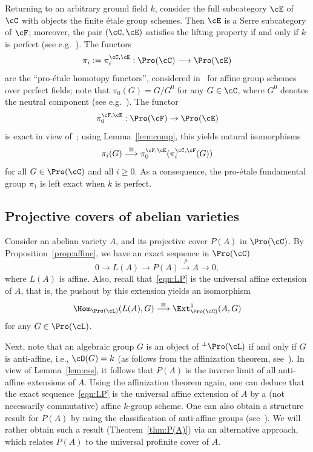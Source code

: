 \begin{rema}\label{rem:profinite}
Returning to an arbitrary ground field $k$, consider the full subcategory $\cE$ of $\cC$ with objects the finite \'etale group schemes. Then $\cE$ is a Serre subcategory of $\cF$; moreover, the pair $(\cC,\cE)$ satisfies the lifting property if and only if $k$ is perfect (see e.g.~\cite[Thm.~1.1, Rem.~3.3]{Br15}). The functors
\[
\pi_i := \pi_i^{\cC,\cE} :
\Pro(\cC) \longrightarrow \Pro(\cE)
\]
are the ``pro-\'etale homotopy functors'', considered in~\cite[V.3.4.1]{DG} for affine group schemes over perfect fields; note that $\pi_0(G) = G/G^0$ for any $G \in \cC$, where $G^0$ denotes the neutral component (see e.g.~\cite[II.5.1]{DG}). The functor
\[
\pi_0^{\cF,\cE} : \Pro(\cF) \to \Pro(\cE)
\]
is exact in view of~\cite[V.3.1.5]{DG}; using Lemma~\ref{lem:comp}, this yields natural isomorphisms
\[
\pi_i(G) \stackrel{\cong}{\longrightarrow}
\pi_0^{\cF,\cE}(\pi_i^{\cC,\cF}(G))
\]
for all $G \in \Pro(\cC)$ and all $i \geq 0$. As a consequence, the pro-\'etale fundamental group $\pi_1$ is left exact when $k$ is perfect.
\end{rema}

\subsection{Projective covers of abelian varieties}\label{subsec:P(A)}

Consider an abelian variety $A$, and its projective cover $P(A)$ in $\Pro(\cC)$. By Proposition~\ref{prop:affine}, we have an exact sequence in $\Pro(\cC)$
\begin{equation}\label{eqn:LP}
0 \longrightarrow L(A) \longrightarrow P(A)
\stackrel{\rho}{\longrightarrow} A \longrightarrow 0,
\end{equation}
where $L(A)$ is affine. Also, recall that~\eqref{eqn:LP} is the universal affine extension of $A$, that is, the pushout by this extension yields an isomorphism
\begin{equation}\label{eqn:univCL}
\Hom_{\Pro(\cL)}(L(A),G)
\stackrel{\cong}{\longrightarrow}
\Ext^1_{\Pro(\cC)}(A,G)
\end{equation}
for any $G \in \Pro(\cL)$.

Next, note that an algebraic group $G$ is an object of ${^{\perp} \Pro(\cL)}$ if and only if $G$ is anti-affine, i.e., $\cO(G) = k$ (as follows from the affinization theorem, see~\cite[III.3.8.2]{DG}). In view of Lemma~\ref{lem:ess}, it follows that $P(A)$ is the inverse limit of all anti-affine extensions of $A$. Using the affinization theorem again, one can deduce that the exact sequence~\eqref{eqn:LP} is the universal affine extension of $A$ by a (not necessarily commutative) affine $k$-group scheme. One can also obtain a structure result for $P(A)$ by using the classification of anti-affine groups (see~\cite[Thm.~2.7]{Br09}). We will rather obtain such a result (Theorem~\ref{thm:P(A)}) via an alternative approach, which relates $P(A)$ to the universal profinite cover of $A$.

